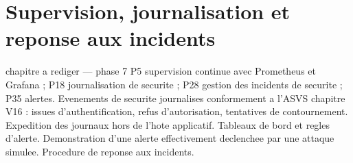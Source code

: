 ﻿%
\chapter{Supervision, journalisation et reponse aux incidents}
\label{chap:supervision}

\begin{constat}{chapitre a rediger --- phase 7}
P5 supervision continue avec Prometheus et Grafana ; P18 journalisation de securite ; P28 gestion des incidents de securite ; P35 alertes. Evenements de securite journalises conformement a l'ASVS chapitre V16 : issues d'authentification, refus d'autorisation, tentatives de contournement. Expedition des journaux hors de l'hote applicatif. Tableaux de bord et regles d'alerte. Demonstration d'une alerte effectivement declenchee par une attaque simulee. Procedure de reponse aux incidents.
\end{constat}
